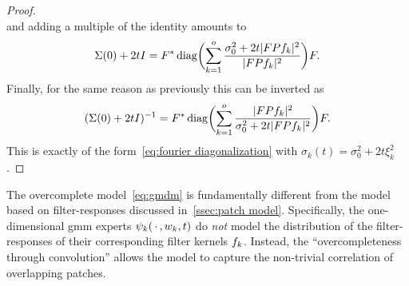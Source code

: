 \begin{proof}
\begin{equation}
	\end{equation}
	and adding a multiple of the identity amounts to
	\begin{equation}
		\Sigma(\num{0}) + \num{2}tI = F^{\ast}\operatorname{diag}\biggl(\sum_{k=\num{1}}^o \frac{\sigma^{\num{2}}_{\num{0}} + \num{2}t|F P f_k|^{\num{2}}}{|F P f_k|^{\num{2}}}\biggr) F.
	\end{equation}
	Finally, for the same reason as previously this can be inverted as
	\begin{equation}
		(\Sigma(\num{0}) + \num{2}tI)^{-1} = F^{\ast}\operatorname{diag}\biggl(\sum_{k=\num{1}}^o \frac{|F P f_k|^{\num{2}}}{\sigma^{\num{2}}_{\num{0}} + \num{2}t|F P f_k|^{\num{2}}}\biggr) F.
	\end{equation}
	This is exactly of the form~\cref{eq:fourier diagonalization} with \( \sigma_k(t) = \sigma_{\num{0}}^{\num{2}} + \num{2}t\xi_k^{\num{2}} \).
\end{proof}

The overcomplete model~\eqref{eq:gmdm} is fundamentally different from the model based on filter-responses discussed in~\cref{ssec:patch model}.
Specifically, the one-dimensional \gls{gmm} experts \( \psi_k(\,\cdot\,, w_k, t) \) do \emph{not} model the distribution of the filter-responses of their corresponding filter kernels \( f_k \).
Instead, the \enquote{overcompleteness through convolution} allows the model to capture the non-trivial correlation of overlapping patches.


